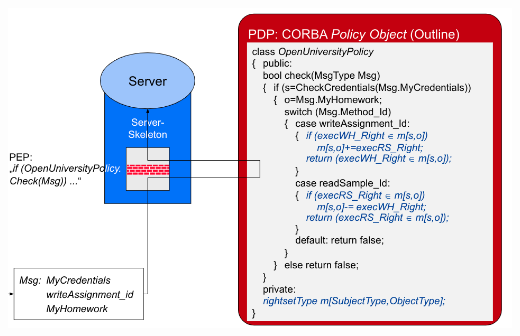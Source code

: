 \documentclass[a4paper]{article}
\begin{document}
\begin{multicols}{3}
\begin{multicols*}{2}
        \includegraphics[width=.9\linewidth]{Assets/Systemsicherheit-cobra-2.png}
    \end{multicols*}


\end{multicols}
\end{document}
